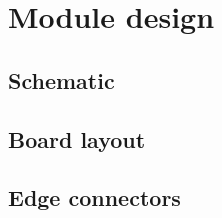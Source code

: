  
\section{Module design}

\subsection{Schematic}

\subsection{Board layout}

\subsection{Edge connectors}



